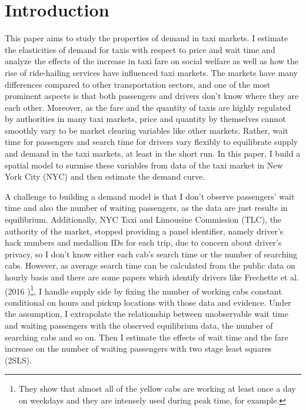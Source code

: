 \vspace{0.5cm}
\section{Introduction}
\hspace{0.5cm}  This paper aims to study the properties of demand in taxi markets. I estimate the elasticities of demand for taxis with respect to price and wait time and analyze the effects of the increase in taxi fare on social welfare as well as how the rise of ride-hailing services have influenced taxi markets. The markets have many differences compared to other transportation sectors, and one of the most prominent aspects is that both passengers and drivers don't know where they are each other. Moreover, as the fare and the quantity of taxis are highly regulated by authorities in many taxi markets, price and quantity by themselves cannot smoothly vary to be market clearing variables like other markets. Rather, wait time for passengers and search time for drivers vary flexibly to equilibrate supply and demand in the taxi markets, at least in the short run. In this paper, I build a spatial model to surmise these variables from data of the taxi market in New York City (NYC) and then estimate the demand curve.

A challenge to building a demand model is that I don't observe passengers' wait time and also the number of waiting passengers, as the data are just results in equilibrium. Additionally, NYC Taxi and Limousine Commission (TLC), the authority of the market, stopped providing a panel identifier, namely driver's hack numbers and medallion IDs for each trip, due to concern about driver's privacy, so I don't know either each cab's search time or the number of searching cabs. However, as average search time can be calculated from the public data on hourly basis and there are some papers which identify drivers like Frechette et al.(2016 \cite{frechette2016frictions})\footnote{They show that almost all of the yellow cabs are working at least once a day on weekdays and they are intensely used during peak time, for example.}, I handle supply side by fixing the number of working cabs constant conditional on hours and pickup locations with those data and evidence. Under the assumption, I extrapolate the relationship between unobservable wait time and waiting passengers with the observed equilibrium data, the number of searching cabs and so on. Then I estimate the effects of wait time and the fare increase on the number of waiting passengers with two stage least squares (2SLS).

